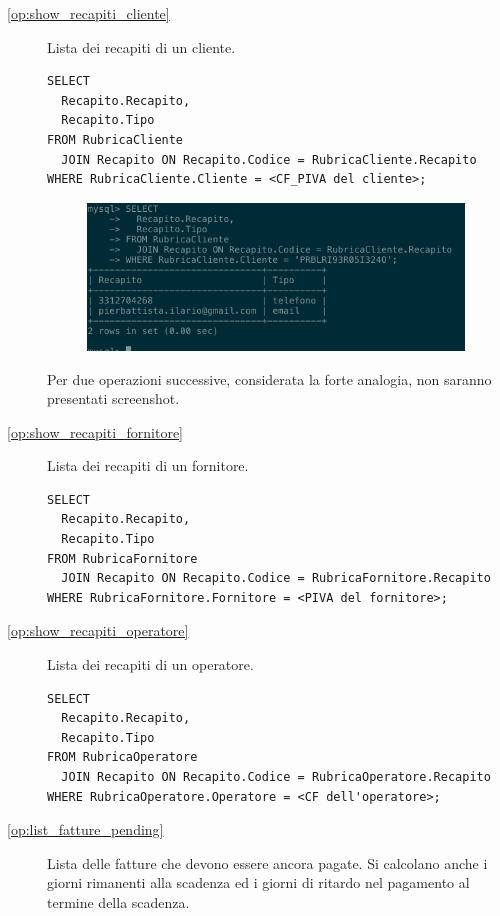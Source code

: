 \begin{description}
            \item[\ref{op:show_recapiti_cliente}] Lista dei recapiti di un cliente.

              \begin{lstlisting}
SELECT
  Recapito.Recapito,
  Recapito.Tipo
FROM RubricaCliente
  JOIN Recapito ON Recapito.Codice = RubricaCliente.Recapito
WHERE RubricaCliente.Cliente = <CF_PIVA del cliente>;
              \end{lstlisting}

              \begin{figure}[H]
                \centering
                \includegraphics[width=10cm]{images/screenshots/list_recapiti_cliente.png}
              \end{figure}

              Per due operazioni successive, considerata la forte analogia, non saranno presentati screenshot.

            \item[\ref{op:show_recapiti_fornitore}] Lista dei recapiti di un fornitore.

              \begin{lstlisting}
SELECT
  Recapito.Recapito,
  Recapito.Tipo
FROM RubricaFornitore
  JOIN Recapito ON Recapito.Codice = RubricaFornitore.Recapito
WHERE RubricaFornitore.Fornitore = <PIVA del fornitore>;
              \end{lstlisting}

            \item[\ref{op:show_recapiti_operatore}] Lista dei recapiti di un operatore.

              \begin{lstlisting}
SELECT
  Recapito.Recapito,
  Recapito.Tipo
FROM RubricaOperatore
  JOIN Recapito ON Recapito.Codice = RubricaOperatore.Recapito
WHERE RubricaOperatore.Operatore = <CF dell'operatore>;
              \end{lstlisting}

            \item[\ref{op:list_fatture_pending}] Lista delle fatture che devono essere ancora pagate. Si calcolano anche i giorni rimanenti alla scadenza ed i giorni di ritardo nel pagamento al termine della scadenza.


\end{description}
